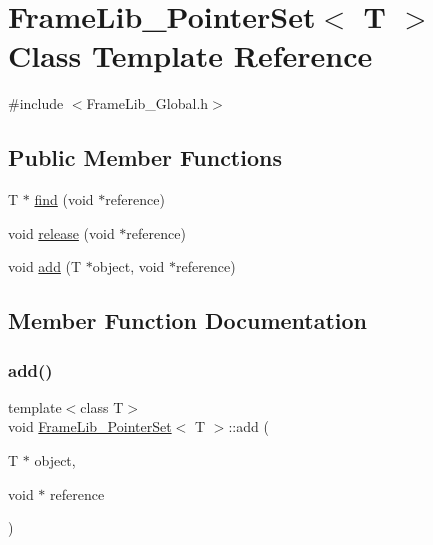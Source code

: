 \hypertarget{class_frame_lib___pointer_set}{}\section{Frame\+Lib\+\_\+\+Pointer\+Set$<$ T $>$ Class Template Reference}
\label{class_frame_lib___pointer_set}


{\ttfamily \#include $<$Frame\+Lib\+\_\+\+Global.\+h$>$}

\subsection*{Public Member Functions}
\begin{DoxyCompactItemize}
\item 
T $\ast$ \hyperlink{class_frame_lib___pointer_set_ae088998b19a4ad6bc3940c92a1599793}{find} (void $\ast$reference)
\item 
void \hyperlink{class_frame_lib___pointer_set_a0180b8255af17da63729ea4cb904ed33}{release} (void $\ast$reference)
\item 
void \hyperlink{class_frame_lib___pointer_set_a875276ee7f5288dd07941347f1844a06}{add} (T $\ast$object, void $\ast$reference)
\end{DoxyCompactItemize}


\subsection{Member Function Documentation}
\mbox{\label{class_frame_lib___pointer_set_a875276ee7f5288dd07941347f1844a06}} 
\subsubsection{\texorpdfstring{add()}{add()}}
{\footnotesize\ttfamily template$<$class T$>$ \\
void \hyperlink{class_frame_lib___pointer_set}{Frame\+Lib\+\_\+\+Pointer\+Set}$<$ T $>$\+::add (\begin{DoxyParamCaption}\item[{T $\ast$}]{object,  }\item[{void $\ast$}]{reference }\end{DoxyParamCaption})\hspace{0.3cm}{\ttfamily [inline]}}

